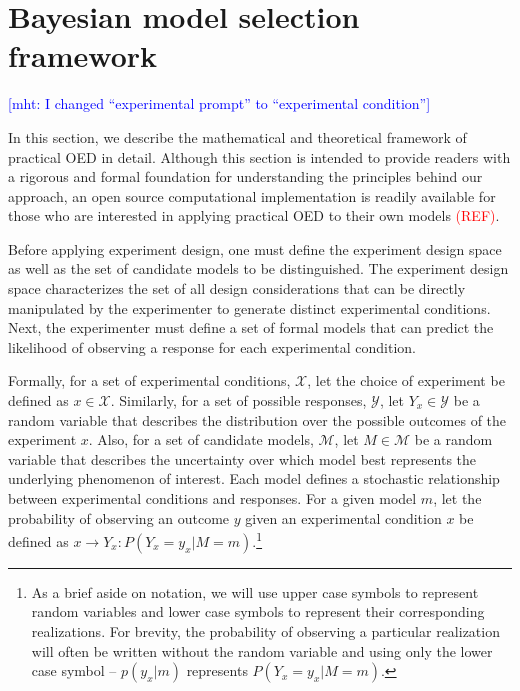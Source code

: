 \documentclass{article}
\newcommand{\red}[1]{\textcolor{Red}{#1}}
\newcommand{\mht}[1]{\textcolor{Blue}{[mht: #1]}}
\begin{document}
\section{Bayesian model selection framework}
\label{s:bayes}
\mht{I changed ``experimental prompt'' to ``experimental condition''}

In this section, we describe the mathematical and theoretical framework of practical OED in detail. Although this section is intended to provide readers with a rigorous and formal foundation for understanding the principles behind our approach, an open source computational implementation is readily available for those who are interested in applying practical OED to their own models \red{(REF)}. 

Before applying experiment design, one must define the experiment design space as well as the set of candidate models to be distinguished. The experiment design space characterizes the set of all design considerations that can be directly manipulated by the experimenter to generate distinct experimental conditions. Next, the experimenter must define a set of formal models that can predict the likelihood of observing a response for each experimental condition. 

Formally, for a set of experimental conditions, $\mathcal{X}$, let the choice of experiment be defined as $x \in \mathcal{X}$. Similarly, for a set of possible responses, $\mathcal{Y}$, let $Y_x \in \mathcal{Y}$ be a random variable that describes the distribution over the possible outcomes of the experiment $x$. Also, for a set of candidate models, $\mathcal{M}$, let $M \in \mathcal{M}$ be a random variable that describes the uncertainty over which model best represents the underlying phenomenon of interest. Each model defines a stochastic relationship between experimental conditions and responses. For a given model $m$, let the probability of observing an outcome $y$ given an experimental condition $x$ be defined as $x \rightarrow Y_x: P(Y_x = y_x | M = m)$.\footnote{
As a brief aside on notation, we will use upper case symbols to represent random variables and lower case symbols to represent their corresponding realizations. For brevity, the probability of observing a particular realization will often be written without the random variable and using only the lower case symbol -- $p(y_x|m)$ represents $P(Y_x = y_x | M = m)$.
}
\end{document}
